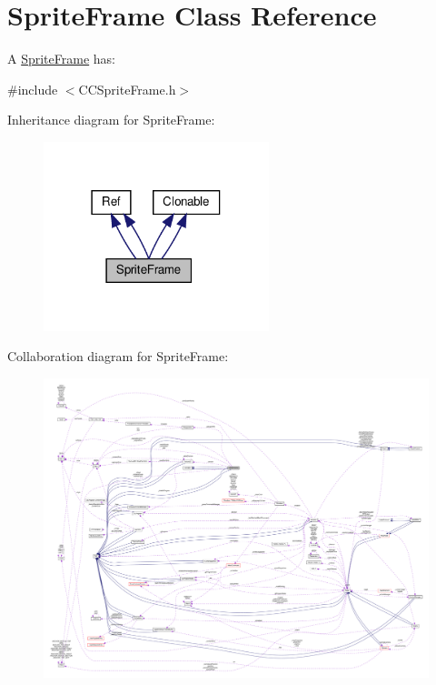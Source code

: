 \hypertarget{classSpriteFrame}{}\section{Sprite\+Frame Class Reference}
\label{classSpriteFrame}


A \hyperlink{classSpriteFrame}{Sprite\+Frame} has\+:  




{\ttfamily \#include $<$C\+C\+Sprite\+Frame.\+h$>$}



Inheritance diagram for Sprite\+Frame\+:
\nopagebreak
\begin{figure}[H]
\begin{center}
\leavevmode
\includegraphics[width=186pt]{classSpriteFrame__inherit__graph}
\end{center}
\end{figure}


Collaboration diagram for Sprite\+Frame\+:
\nopagebreak
\begin{figure}[H]
\begin{center}
\leavevmode
\includegraphics[width=350pt]{classSpriteFrame__coll__graph}
\end{center}
\end{figure}
